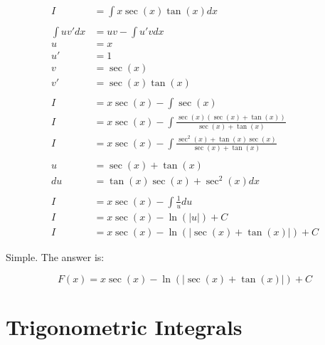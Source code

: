 \documentclass[12pt]{article}
\begin{document}
\begin{align}
    I           & = \int x \sec(x)\tan(x) dx                                         \\
    \nonumber                                                                        \\
    \int uv' dx & = uv - \int u'v dx                                                 \\
    u           & = x                                                                \\
    u'          & = 1                                                                \\
    v           & = \sec(x)                                                          \\
    v'          & = \sec(x)\tan(x)                                                   \\
    \nonumber                                                                        \\
    I           & = x\sec(x) - \int \sec(x)                                          \\
    I           & = x\sec(x) - \int \frac{\sec(x)(\sec(x)+\tan(x))}{\sec(x)+\tan(x)} \\
    I           & = x\sec(x) - \int \frac{\sec^2(x)+\tan(x)\sec(x)}{\sec(x)+\tan(x)} \\
    \nonumber                                                                        \\
    u           & = \sec(x)+\tan(x)                                                  \\
    du          & = \tan(x)\sec(x)+\sec^2(x) dx                                      \\
    \nonumber                                                                        \\
    I           & = x\sec(x) - \int \frac{1}{u} du                                   \\
    I           & = x\sec(x) - \ln(|u|) + C                                          \\
    I           & = x\sec(x) - \ln(|\sec(x)+\tan(x)|) + C
\end{align}


Simple.
The answer is:

$$
    F(x) = x\sec(x) - \ln(|\sec(x)+\tan(x)|) + C
$$

\section{Trigonometric Integrals}
\end{document}
